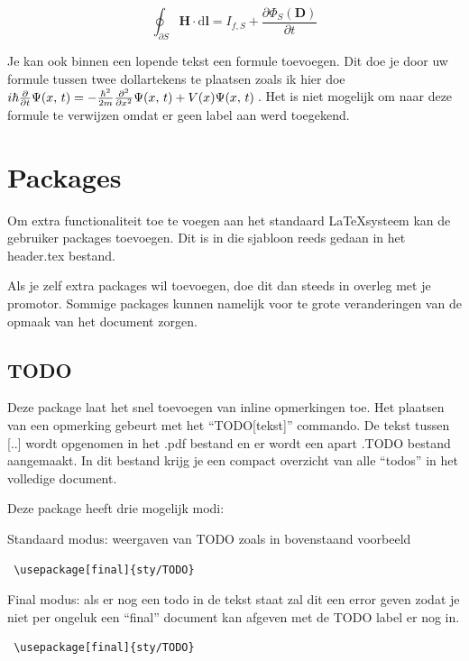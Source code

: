 \begin{equation} \label{eq:maxwell}
\oint_{\partial S} \mathbf{H} \cdot \mathrm{d}\mathbf{l} = I_{f,S} + \frac {\partial \Phi_S(\mathbf D)}{\partial t} 
\end{equation}

Je kan ook binnen een lopende tekst een formule toevoegen. Dit doe je door uw formule tussen twee dollartekens te plaatsen zoals ik hier doe $i \hbar {\partial \over \partial t} \Psi(x,\,t)= -{\hbar^2  \over 2m} {\partial^2 \over \partial x^2} \Psi(x,\,t)+ V(x)\Psi(x,\,t)\,$. Het is niet mogelijk om naar deze formule te verwijzen omdat er geen label aan werd toegekend.


\section{Packages}
Om extra functionaliteit toe te voegen aan het standaard \LaTeX systeem kan de gebruiker packages toevoegen. Dit is in die sjabloon reeds gedaan in het header.tex bestand.

Als je zelf extra packages wil toevoegen, doe dit dan steeds in overleg met je promotor. Sommige packages kunnen namelijk voor te grote veranderingen van de opmaak van het document zorgen.


\subsection{TODO}

Deze package laat het snel toevoegen van inline opmerkingen toe.
Het plaatsen van een opmerking gebeurt met het ``TODO[tekst]'' commando.
De tekst tussen [..] wordt opgenomen in het .pdf bestand en er wordt een apart .TODO bestand aangemaakt. 
In dit bestand krijg je een compact overzicht van alle ``todos'' in het volledige document.


Deze package heeft drie mogelijk modi:

Standaard modus: weergaven van TODO zoals in bovenstaand voorbeeld
\begin{verbatim}
 \usepackage[final]{sty/TODO}
\end{verbatim}

Final modus: als er nog een todo in de tekst staat zal dit een error geven zodat je niet per ongeluk een ``final'' document kan afgeven met de TODO label er nog in.
\begin{verbatim}
 \usepackage[final]{sty/TODO}
\end{verbatim}

